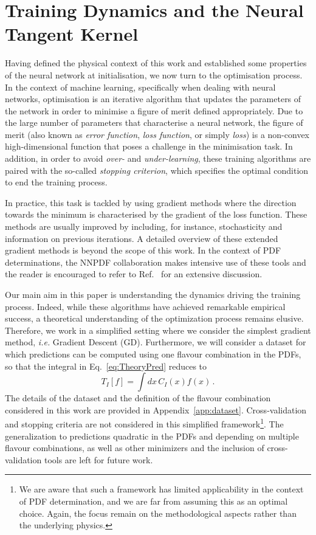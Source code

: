 \section{Training Dynamics and the Neural Tangent Kernel}
\label{sec:Training}

Having defined the physical context of this work and established some properties
of the neural network at initialisation, we now turn to the optimisation
process. In the context of machine learning, specifically when dealing with
neural networks, optimisation is an iterative algorithm that updates the
parameters of the network in order to minimise a figure of merit defined
appropriately. Due to the large number of parameters that characterise a neural
network, the figure of merit (also known as \textit{error function},
\textit{loss function}, or simply \textit{loss}) is a non-convex
high-dimensional function that poses a challenge in the minimisation task. In
addition, in order to avoid \textit{over-} and \textit{under-learning}, these
training algorithms are paired with the so-called \textit{stopping criterion},
which specifies the optimal condition to end the training process.

In practice, this task is tackled by using gradient methods where the direction
towards the minimum is characterised by the gradient of the loss function. These
methods are usually improved by including, for instance, stochasticity and
information on previous iterations. A detailed overview of these extended
gradient methods is beyond the scope of this work. In the context of PDF
determinations, the NNPDF collaboration makes intensive use of these tools and
the reader is encouraged to refer to Ref.~\cite{NNPDF:2021njg} for an extensive
discussion.

Our main aim in this paper is understanding the dynamics driving the training
process. Indeed, while these algorithms have achieved remarkable empirical
success, a theoretical understanding of the optimization process remains
elusive. Therefore, we work in a simplified setting where we consider the
simplest gradient method, \textit{i.e.} Gradient Descent (GD). Furthermore, we
will consider a dataset for which predictions can be computed using one flavour
combination in the PDFs, so that the integral in Eq.~\eqref{eq:TheoryPred}
reduces to
\begin{equation}
    \label{eq:TheoryPredSingleFlav}
    T_I[f] = \int dx\, C_{I}(x) f(x)\,.
\end{equation}
The details of the dataset and the definition of the flavour combination
considered in this work are provided in Appendix~\ref{app:dataset}.
Cross-validation and stopping criteria are not considered in this simplified
framework\footnote{We are aware that such a framework has limited applicability
in the context of PDF determination, and we are far from assuming this as an
optimal choice. Again, the focus remain on the methodological aspects rather
than the underlying physics.}. The generalization to predictions
quadratic in the PDFs and depending on multiple flavour combinations, as well
as other minimizers and the inclusion of cross-validation tools are left for
future work.

